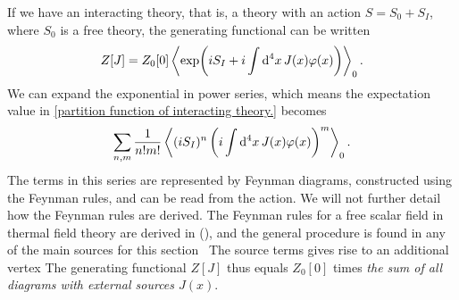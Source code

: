 If we have an interacting theory, that is, a theory with an action $S = S_0 + S_I$, where $S_0$ is a free theory, the generating functional can be written
\begin{equation}
    \label{partition function of interacting theory.}
    Z[J] 
    = Z_0[0] \left\langle \exp(iS_I + i\int \dd^4 x \, J(x) \varphi(x)) \right\rangle_0.
\end{equation}
We can expand the exponential in power series, which means the expectation value in \autoref{partition function of interacting theory.} becomes
\begin{equation}
    \sum_{n, m} \frac{1}{n! m!} \left\langle (iS_I)^n \left(i\int \dd^4 x \, J(x) \varphi(x)\right)^m \right\rangle_0.
\end{equation}
The terms in this series are represented by Feynman diagrams, constructed using the Feynman rules, and can be read from the action.
We will not further detail how the Feynman rules are derived.
The Feynman rules for a free scalar field in thermal field theory are derived in (), and the general procedure is found in any of the main sources for this section~\autocite{peskinIntroductionQuantumField1995,schwartzQuantumFieldTheory2013,weinbergQuantumTheoryFields1995,weinbergQuantumTheoryFields1996}
The source terms gives rise to an additional vertex
The generating functional $Z[J]$ thus equals $Z_0[0]$ times \emph{the sum of all diagrams with external sources $J(x)$}.

